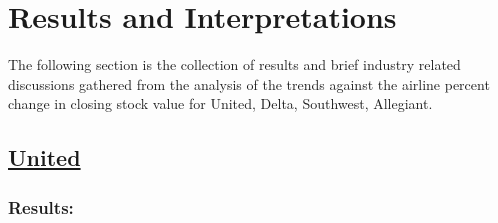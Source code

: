 \documentclass[12pt]{report}
\begin{document}
\newpage
\chapter*{Results and Interpretations}
The following section is the collection of results and brief industry related discussions gathered from the analysis of the trends against the airline percent change in closing stock value for United, Delta, Southwest, Allegiant.
\section*{\underline{United}}
\subsection*{Results:}
\end{document}

